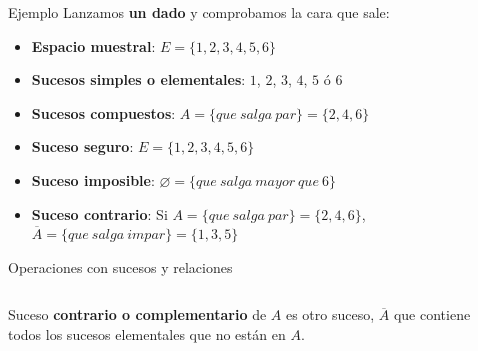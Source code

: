 \documentclass[11pt,handout]{beamer}
\begin{document}
\begin{frame}{Ejemplo}
Lanzamos \textbf{un dado} y comprobamos la cara que sale:
\begin{itemize}[<+->]
\item \textbf{Espacio muestral}: $E=\lbrace 1,2,3,4,5,6 \rbrace $
\item \textbf{Sucesos simples o elementales}: $1$, $2$, $3$, $4$, $5$ ó $6$
\item \textbf{Sucesos compuestos}: $A=\lbrace que\ salga\ par\rbrace=\lbrace2,4,6\rbrace$
\item \textbf{Suceso seguro}: $E=\lbrace 1,2,3,4,5,6 \rbrace $
\item \textbf{Suceso imposible}: $\varnothing=\lbrace que\ salga \ mayor \ que \ 6\rbrace$
\item \textbf{Suceso contrario}: Si $A=\lbrace que\ salga\ par\rbrace=\lbrace2,4,6\rbrace$, $\overline{A}=\lbrace que\ salga\ impar\rbrace=\lbrace1,3,5\rbrace$ 
\end{itemize}
\end{frame}
\begin{frame}
{Operaciones con sucesos y relaciones}
\begin{columns}
\begin{column}{0.7\textwidth}
\begin{block}{}
Suceso \textbf{contrario o complementario} de $A$ es otro suceso, $\overline{A}$ que contiene todos los sucesos elementales que no están en $A$.
\end{block}

\end{column}
\begin{column}{0.3\textwidth}


\end{column}
\end{columns}





\end{frame}
\end{document}
